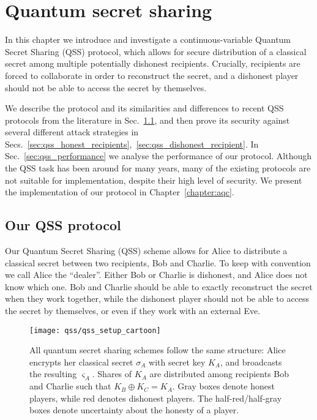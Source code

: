 %

\chapter{Quantum secret sharing}\label{chapter:qss}


In this chapter we introduce and investigate a continuous-variable Quantum Secret Sharing (QSS) protocol, which allows for secure distribution of a classical secret among multiple potentially dishonest recipients. Crucially, recipients are forced to collaborate in order to reconstruct the secret, and a dishonest player should not be able to access the secret by themselves.

We describe the protocol and its similarities and differences to recent QSS protocols from the literature in Sec.~\ref{sec:qss_our_protocol}, and then prove its security against several different attack strategies in Secs.~\ref{sec:qss_honest_recipients},~\ref{sec:qss_dishonest_recipient}. In Sec.~\ref{sec:qss_performance} we analyse the performance of our protocol. Although the QSS task has been around for many years, many of the existing protocols are not suitable for implementation, despite their high level of security. We present the implementation of our protocol in Chapter~\ref{chapter:aqc}.

\section{Our QSS protocol}\label{sec:qss_our_protocol}

Our Quantum Secret Sharing (QSS) scheme allows for Alice to distribute a classical secret between two recipients, Bob and Charlie. To keep with convention we call Alice the ``dealer''. Either Bob or Charlie is dishonest, and Alice does not know which one. Bob and Charlie should be able to exactly reconstruct the secret when they work together, while the dishonest player should not be able to access the secret by themselves, or even if they work with an external Eve.


\begin{figure}[htp]
\captionsetup{width=0.8\linewidth}
\centering
\texttt{[image: qss/qss\_setup\_cartoon]}
\caption{\label{fig:qss_structure} All quantum secret sharing schemes follow the same structure: Alice encrypts her classical secret $\sigma_A$ with secret key $K_A$, and broadcasts the resulting $\varsigma_A$. Shares of $K_A$ are distributed among recipients Bob and Charlie such that $K_B \oplus K_C = K_A$. Gray boxes denote honest players, while red denotes dishonest players. The half-red/half-gray boxes denote uncertainty about the honesty of a player. %
}
\end{figure}

